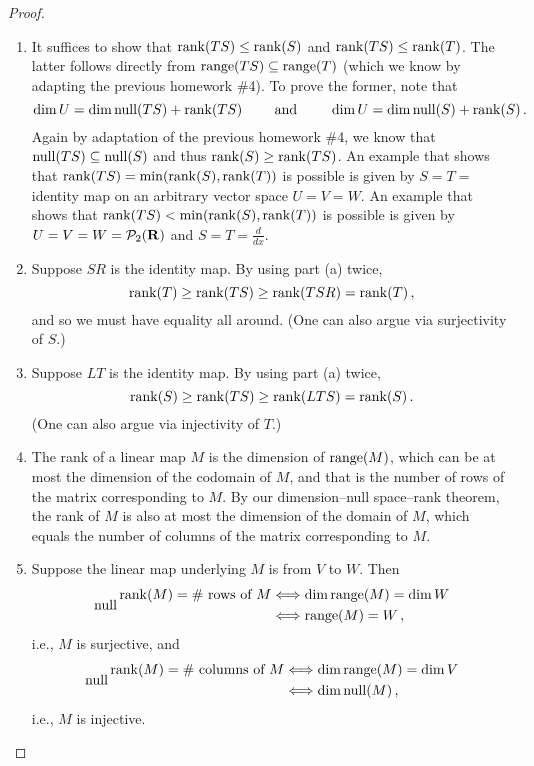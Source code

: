 \documentclass[11pt]{amsart}
\begin{document}
\begin{enumerate}[(1)]
\begin{proof}
\begin{enumerate}

\item It suffices to show that $\operatorname{rank}(TS) \le \operatorname{rank}(S)$ and $\operatorname{rank}(TS) \le \operatorname{rank}(T)$. The latter follows directly from $\operatorname{range}(TS) \subseteq \operatorname{range}(T)$ (which we know by adapting the previous homework \#4).
To prove the former, note that
\[
  \dim U = \dim \operatorname{null}(TS) + \operatorname{rank}(TS)
  \qquad \text{ and } \qquad
  \dim U = \dim \operatorname{null}(S) + \operatorname{rank}(S) \, .
\]
Again by adaptation of the previous homework \#4, we know that $\operatorname{null}(TS) \subseteq \operatorname{null}(S)$ and thus $\operatorname{rank}(S) \ge \operatorname{rank}(TS)$.
An example that shows that $\operatorname{rank}(TS) = \min(\operatorname{rank}(S), \operatorname{rank}(T ))$ is possible is given by $S=T=$ identity map on an arbitrary vector space $U=V=W$.
An example that shows that $\operatorname{rank}(TS) < \min(\operatorname{rank}(S), \operatorname{rank}(T ))$ is possible is given by $U=V=W= \mathcal{P}_2(\mathbf{R})$ and $S=T= \frac{ d }{ dx }$.

\item Suppose $SR$ is the identity map. By using part (a) twice,
\[
  \operatorname{rank}(T) \ge \operatorname{rank}(TS) \ge \operatorname{rank}(TSR) = \operatorname{rank}(T) \, ,
\]
and so we must have equality all around.
(One can also argue via surjectivity of $S$.)

\item Suppose $LT$ is the identity map. By using part (a) twice,
\[
  \operatorname{rank}(S) \ge \operatorname{rank}(TS) \ge \operatorname{rank}(LTS) = \operatorname{rank}(S) \, .
\]
(One can also argue via injectivity of $T$.)

\item The rank of a linear map $M$ is the dimension of $\operatorname{range}(M)$, which can be at most the dimension of the codomain of $M$, and that is the number of rows of the matrix corresponding to $M$.
By our dimension--null space--rank theorem, the rank of $M$ is also at most the dimension of the domain of $M$, which equals the number of columns of the matrix corresponding to $M$.

\item Suppose the linear map underlying $M$ is from $V$ to $W$. Then
\begin{align*}
  \rank(M) = \# \text{ rows of } M
  &\Longleftrightarrow \dim \range(M) = \dim W \\
  &\Longleftrightarrow \range(M) = W \, ,
\end{align*}
i.e., $M$ is surjective, and
\begin{align*}
  \rank(M) = \# \text{ columns of } M
  &\Longleftrightarrow \dim \range(M) = \dim V \\
  &\Longleftrightarrow \dim \null(M) \, ,
\end{align*}
i.e., $M$ is injective. \qedhere
\end{enumerate}
\end{proof}


\end{enumerate}
\end{document}
